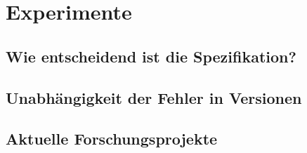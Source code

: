 \section{Experimente}
\subsection{Wie entscheidend ist die Spezifikation?}
\subsection{Unabhängigkeit der Fehler in Versionen}
\subsection{Aktuelle Forschungsprojekte}